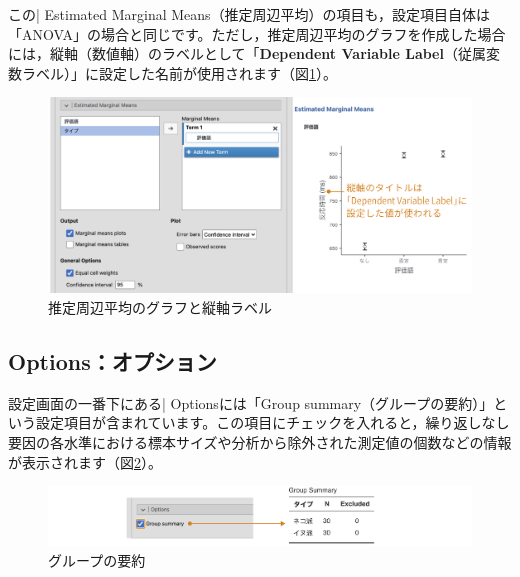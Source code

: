 \documentclass[
  12pt,
  a5jpaper,
  lualatex, ja=standard]{bxjsbook}
\begin{document}
この\colorbox{bar}{\textcolor{gmoji2}{| Estimated Marginal Means}}（推定周辺平均）の項目も，設定項目自体は「ANOVA」の場合と同じです。ただし，推定周辺平均のグラフを作成した場合には，縦軸（数値軸）のラベルとして「\textbf{Dependent Variable Label}（従属変数ラベル）」に設定した名前が使用されます（図\ref{fig:ANOVA-rm-emm-plot}）。

\begin{figure}[!ht]

{\centering \includegraphics[width=1\linewidth]{images/ANOVA/rm-emm-plot} 

}

\caption{推定周辺平均のグラフと縦軸ラベル}\label{fig:ANOVA-rm-emm-plot}
\end{figure}

\hypertarget{sub:ANOVA-rm-options}{%
\subsection{Options：オプション}\label{sub:ANOVA-rm-options}}

設定画面の一番下にある\colorbox{bar}{\textcolor{gmoji2}{| Options}}には「Group summary（グループの要約）」という設定項目が含まれています。この項目にチェックを入れると，繰り返しなし要因の各水準における標本サイズや分析から除外された測定値の個数などの情報が表示されます（図\ref{fig:ANOVA-rm-options}）。

\begin{figure}[!ht]

{\centering \includegraphics[width=1\linewidth]{images/ANOVA/rm-options} 

}

\caption{グループの要約}\label{fig:ANOVA-rm-options}
\end{figure}
\end{document}

